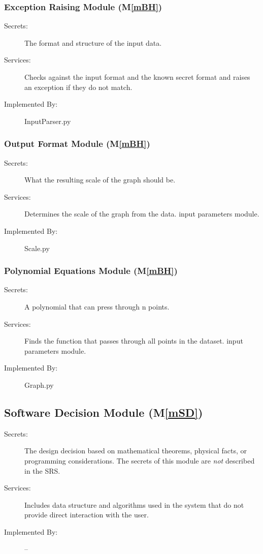 \documentclass[12pt, titlepage]{article}
\newcommand{\mref}[1]{M\ref{#1}}
\begin{document}
\subsubsection{Exception Raising Module (\mref{mBH})}

\begin{description}
\item[Secrets:] The format and structure of the input data.
\item[Services:] Checks against the input format and the known secret format and raises an exception if they do not match.
\item[Implemented By:] InputParser.py
\end{description}

\subsubsection{Output Format Module (\mref{mBH})}

\begin{description}
\item[Secrets:]What the resulting scale of the graph should be. 
\item[Services:]Determines the scale of the graph from the data.
  input parameters module.
\item[Implemented By:] Scale.py
\end{description}

\subsubsection{Polynomial Equations Module (\mref{mBH})}

\begin{description}
\item[Secrets:]A polynomial that can press through n points.  
\item[Services:]Finds the function that passes through all points in the dataset. 
  input parameters module.
\item[Implemented By:] Graph.py
\end{description}


\subsection{Software Decision Module  (\mref{mSD})}

\begin{description}
\item[Secrets:] The design decision based on mathematical theorems, physical
  facts, or programming considerations. The secrets of this module are
  \emph{not} described in the SRS.
\item[Services:] Includes data structure and algorithms used in the system that
  do not provide direct interaction with the user. 
\item[Implemented By:] --
\end{description}
\end{document}
